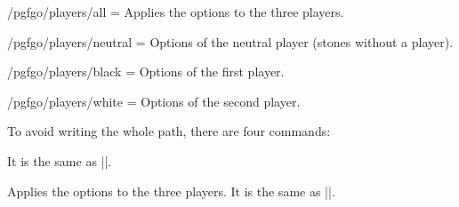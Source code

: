 \begin{goban}[9, stone = {radius = 4pt}, mark = {line = {color = red}}]
\begin{key}{/pgfgo/players/all = }
	Applies the options to the three players.
\end{key}

\begin{key}{/pgfgo/players/neutral = }
	Options of the neutral player (stones without a player).
\end{key}

\begin{key}{/pgfgo/players/black = }
	Options of the first player.
\end{key}

\begin{key}{/pgfgo/players/white = }
	Options of the second player.

	\begin{codeexample}[width=4cm]

		\begin{goban}[3]
		\end{goban}
	\end{codeexample}
\end{key}

To avoid writing the whole path, there are four commands:

\begin{command}{\pgfgosetplayer{}}
	It is the same as ||.
\end{command}

\begin{command}{\pgfgosetallplayers{}}
	Applies the options to the three players. It is the same as ||.

	\begin{codeexample}[width=4cm]

		\begin{goban}[3]
		\end{goban}
	\end{codeexample}
\end{command}


\end{goban}
